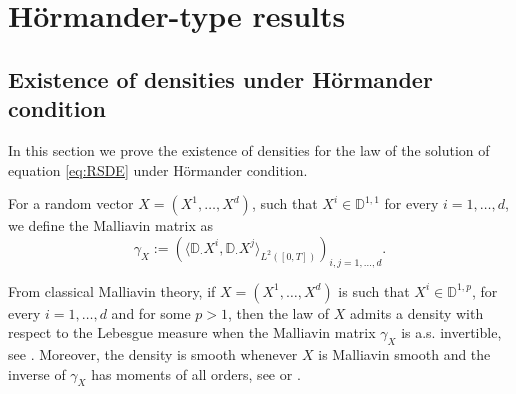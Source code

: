 \documentclass[11pt,a4paper]{article}
\theoremstyle{plain}
\begin{document}
\section{Hörmander-type results}
\label{sec: hoermander}

\subsection{Existence of densities under H\"ormander condition} \label{sec:existencedensity_Hoermander}
In this section we prove the existence of densities for the law of the solution of equation \eqref{eq:RSDE} under H\"ormander condition. 

For a random vector $X = (X^1, \dots, X^d)$, such that  $X^i \in \mathbb{D}^{1,1}$ for every $i=1,\dots,d$, we define the Malliavin matrix as 
\begin{equation}
\label{eq: malliavin matrix}
    \gamma_X := ( \langle \mathbb{D}_{\cdot}X^i, \mathbb{D}_{\cdot}X^j \rangle_{L^2([0,T])} )_{i,j=1,\dots,d}.
\end{equation}

From classical Malliavin theory, if $X = (X^1, \dots, X^d)$ is such that $X^i\in \mathbb{D}^{1,p}$, for every $i=1,\dots,d$ and for some $p>1$, then the law of $X$ admits a density with respect to the Lebesgue measure when the Malliavin matrix $\gamma_X$ is a.s. invertible, see \cite[Theorem 2.1.2]{nualart2006malliavin}. Moreover, the density is smooth whenever $X$ is Malliavin smooth and the inverse of $\gamma_X$ has moments of all orders, see \cite[Theorem 3.2]{hairer2011malliavins} or \cite[Theorem 2.1.4]{malliavin2015stochastic}.
\end{document}
